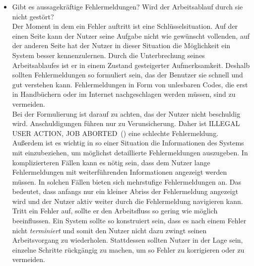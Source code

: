 \begin{description}
\begin{itemize}
\item Gibt es aussagekräftige Fehlermeldungen? Wird der Arbeitsablauf durch sie nicht gestört? \\
Der Moment in dem ein Fehler auftritt ist eine Schlüsselsituation. Auf der einen Seite kann der Nutzer seine Aufgabe nicht wie gewünscht vollenden, auf der anderen Seite hat der Nutzer in dieser Situation die Möglichkeit ein System besser kennenzulernen. Durch die Unterbrechung seines Arbeitsablaufes ist er in einem Zustand gesteigerter Aufmerksamkeit. Deshalb sollten Fehlermeldungen so formuliert sein, das der Benutzer sie schnell und gut verstehen kann. Fehlermeldungen in Form von unlesbaren Codes, die erst in Handbüchern oder im Internet nachgeschlagen werden müssen, sind zu vermeiden.\\
Bei der Formulierung ist darauf zu achten, das der Nutzer nicht beschuldig wird. Anschuldigungen führen nur zu Verunsicherung. Daher ist \glqq ILLEGAL USER ACTION, JOB ABORTED\grqq\ (\cite[S. 143]{Nielsen:1994vk}) eine schlechte Fehlermeldung. Außerdem ist es wichtig in so einer Situation die Informationen des Systems mit einzubeziehen, um möglichst detaillierte Fehlermeldungen auszugeben. In komplizierteren Fällen kann es nötig sein, dass dem Nutzer lange Fehlermeldungen mit weiterführenden Informationen angezeigt werden müssen. In solchen Fällen bieten sich mehrstufige Fehlermeldungen an. Das bedeutet, dass anfangs nur ein kleiner Abriss der Fehlermeldung angezeigt wird und der Nutzer aktiv weiter durch die Fehlermeldung navigieren kann.  \\
Tritt ein Fehler auf, sollte er den Arbeitsfluss so gering wie möglich beeinflussen. Ein System sollte so konstruiert sein, dass es nach einem Fehler nicht \textit{terminiert} und somit den Nutzer nicht dazu zwingt seinen Arbeitsvorgang zu wiederholen. Stattdessen sollten Nutzer in der Lage sein, einzelne Schritte rückgängig zu machen, um so Fehler zu korrigieren oder zu vermeiden. \cite[S. 142 ff.]{Nielsen:1994vk}





\end{itemize}
\end{description}
